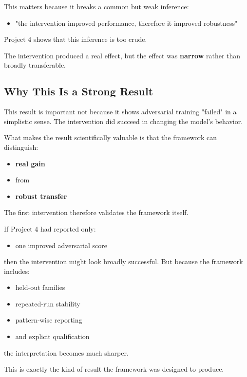 \documentclass[11pt]{article}
\begin{document}
This matters because it breaks a common but weak inference:
\begin{itemize}[leftmargin=1.5em]
    \item "the intervention improved performance, therefore it improved robustness"
\end{itemize}

Project 4 shows that this inference is too crude.

The intervention produced a real effect, but the effect was \textbf{narrow} rather than broadly transferable.

\subsection{Why This Is a Strong Result}

This result is important not because it shows adversarial training "failed" in a simplistic sense. The intervention did succeed in changing the model's behavior.

What makes the result scientifically valuable is that the framework can distinguish:
\begin{itemize}[leftmargin=1.5em]
    \item \textbf{real gain}
    \item from
    \item \textbf{robust transfer}
\end{itemize}

The first intervention therefore validates the framework itself.

If Project 4 had reported only:
\begin{itemize}[leftmargin=1.5em]
    \item one improved adversarial score
\end{itemize}

then the intervention might look broadly successful.
But because the framework includes:
\begin{itemize}[leftmargin=1.5em]
    \item held-out families
    \item repeated-run stability
    \item pattern-wise reporting
    \item and explicit qualification
\end{itemize}

the interpretation becomes much sharper.

This is exactly the kind of result the framework was designed to produce.
\end{document}
